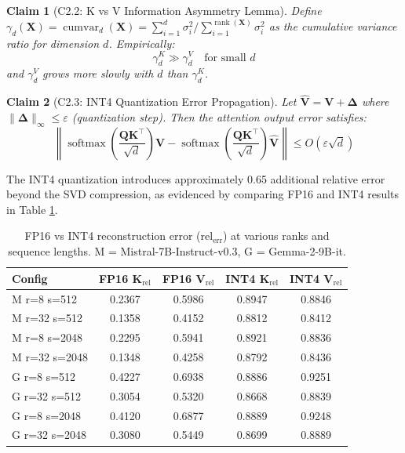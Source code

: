 \documentclass[11pt, a4paper, oneside]{article}
\newtheorem{claim}{Claim}
\theoremstyle{myplain}
\theoremstyle{mydefinition}
\theoremstyle{myremark}
\DeclareMathOperator{\softmax}{softmax}
\DeclareMathOperator{\rank}{rank}
\DeclareMathOperator{\cumvar}{cumvar}
\begin{document}
\begin{claim}[C2.2: K vs V Information Asymmetry Lemma]
    Define $\gamma_d(\mathbf{X}) = \cumvar_d(\mathbf{X}) = \sum_{i=1}^{d} \sigma_i^2 / \sum_{i=1}^{\rank(\mathbf{X})} \sigma_i^2$ as the cumulative variance ratio for dimension $d$. Empirically:
    \begin{equation}
        \gamma_d^K \gg \gamma_d^V \quad \text{for small } d
        \label{eq:k_v_asymmetry}
    \end{equation}
    and $\gamma_d^V$ grows more slowly with $d$ than $\gamma_d^K$.
\end{claim}

\begin{claim}[C2.3: INT4 Quantization Error Propagation]
    Let $\mathbf{\hat{V}} = \mathbf{V} + \mathbf{\Delta}$ where $\|\mathbf{\Delta}\|_\infty \leq \varepsilon$ (quantization step). Then the attention output error satisfies:
    \begin{equation}
        \left\|\softmax\left(\frac{\mathbf{Q}\mathbf{K}^\top}{\sqrt{d}}\right)\mathbf{V} - \softmax\left(\frac{\mathbf{Q}\mathbf{K}^\top}{\sqrt{d}}\right)\mathbf{\hat{V}}\right\| \leq O(\varepsilon \sqrt{d})
        \label{eq:int4_error}
    \end{equation}
\end{claim}

The INT4 quantization introduces approximately 0.65 additional relative error beyond the SVD compression, as evidenced by comparing FP16 and INT4 results in Table \ref{tab:reconstruction}.

\begin{table}[t]
    \centering
    \caption{FP16 vs INT4 reconstruction error ($\text{rel}_{\text{err}}$) at various ranks and sequence lengths. M = Mistral-7B-Instruct-v0.3, G = Gemma-2-9B-it.}
    \begin{tabular}{l|c|c|c|c}
    \toprule
    \textbf{Config} & \textbf{FP16 K}$_{\text{rel}}$ & \textbf{FP16 V}$_{\text{rel}}$ & \textbf{INT4 K}$_{\text{rel}}$ & \textbf{INT4 V}$_{\text{rel}}$ \\
    \midrule
    M r=8 s=512 & 0.2367 & 0.5986 & 0.8947 & 0.8846 \\
    M r=32 s=512 & 0.1358 & 0.4152 & 0.8812 & 0.8412 \\
    M r=8 s=2048 & 0.2295 & 0.5941 & 0.8921 & 0.8836 \\
    M r=32 s=2048 & 0.1348 & 0.4258 & 0.8792 & 0.8436 \\
    G r=8 s=512 & 0.4227 & 0.6938 & 0.8886 & 0.9251 \\
    G r=32 s=512 & 0.3054 & 0.5320 & 0.8668 & 0.8839 \\
    G r=8 s=2048 & 0.4120 & 0.6877 & 0.8889 & 0.9248 \\
    G r=32 s=2048 & 0.3080 & 0.5449 & 0.8699 & 0.8889 \\
    \bottomrule
    \end{tabular}
    \label{tab:reconstruction}
\end{table}
\end{document}
